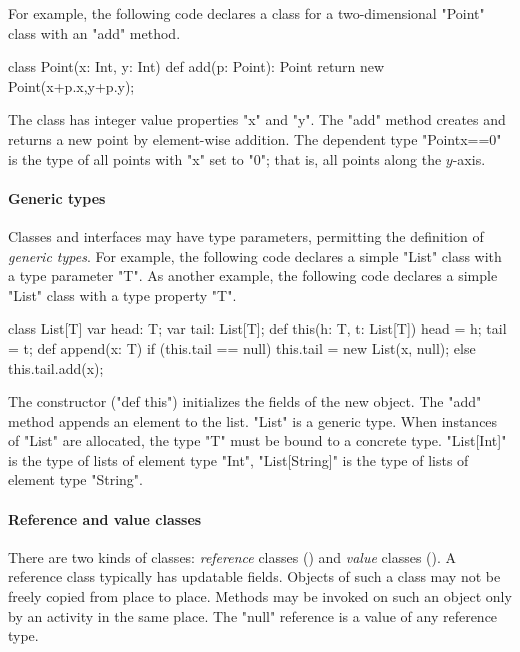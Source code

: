 For example, the following code declares a class for a two-dimensional 
\xcd"Point" class with an \xcd"add" method.
\begin{xten}
class Point(x: Int, y: Int) {
    def add(p: Point): Point { return new Point(x+p.x,y+p.y); }
}
\end{xten}
The class has integer value properties \xcd"x" and \xcd"y".
The \xcd"add" method creates and returns a new point by
element-wise addition.
The dependent type \xcd"Point{x==0}" is the type of all points 
with \xcd"x" set to \xcd"0"; that is, all points along the $y$-axis.

\iftypeparams

\paragraph{Generic types}

Classes and interfaces may have type parameters, permitting the definition of
{\em generic types}.
For example,
the following code declares a simple \xcd"List" class with a
type parameter \xcd"T".
\else
As another example,
the following code declares a simple \xcd"List" class with a
type property \xcd"T".
\fi

\begin{xten}
class List[T] {
    var head: T;
    var tail: List[T];
    def this(h: T, t: List[T]) { head = h; tail = t; }
    def append(x: T) {
        if (this.tail == null)
            this.tail = new List(x, null);
        else
            this.tail.add(x);
    }
}
\end{xten}
The constructor (\xcd"def this") initializes the fields of the new object.
The \xcd"add" method appends an element to the list.
\xcd"List" is a generic type.  When  instances of \xcd"List" are
allocated, the type \param{} \xcd"T" must be bound to a concrete
type.  \xcd"List[Int]" is the type of lists of element type
\xcd"Int", \xcd"List[String]" is the type of lists of element
type \xcd"String".

\paragraph{Reference and value classes}

There are two kinds of classes: \emph{reference} classes
() and \emph{value} classes
().
A reference class typically has updatable fields.
Objects of such a
class may not be freely copied from place to place. Methods may be
invoked on such an object only by an activity in the same place.
The \xcd"null" reference is a value of any reference type.

